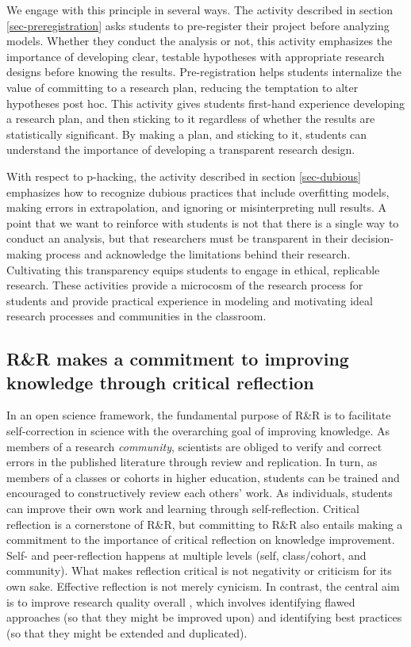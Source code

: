 \documentclass[
  12pt]{article}
\begin{document}
We engage with this principle in several ways.
The activity described in section \ref{sec-preregistration} asks students to pre-register their project before analyzing models.
Whether they conduct the analysis or not, this activity emphasizes the importance of developing clear, testable hypotheses with appropriate research designs before knowing the results.
Pre-registration helps students internalize the value of committing to a research plan, reducing the temptation to alter hypotheses post hoc.
This activity gives students first-hand experience developing a research plan, and then sticking to it regardless of whether the results are statistically significant.
By making a plan, and sticking to it, students can understand the importance of developing a transparent research design.

With respect to p-hacking, the activity described in section \ref{sec-dubious} emphasizes how to recognize dubious practices that include overfitting models, making errors in extrapolation, and ignoring or misinterpreting null results.
A point that we want to reinforce with students is not that there is a single way to conduct an analysis, but that researchers must be transparent in their decision-making process and acknowledge the limitations behind their research.
Cultivating this transparency equips students to engage in ethical, replicable research.
These activities provide a microcosm of the research process for students and provide practical experience in modeling and motivating ideal research processes and communities in the classroom. 

\subsection{R\&R makes a commitment to improving knowledge through critical \textbf{reflection}}

In an open science framework, the fundamental purpose of R\&R is to facilitate self-correction in science \citep{nosek_promoting_2015} with the overarching goal of improving knowledge. 
As members of a research \textit{community}, scientists are obliged to verify and correct errors in the published literature through review and replication. 
In turn, as members of a classes or cohorts in higher education, students can be trained and encouraged to constructively review each others' work. 
As individuals, students can improve their own work and learning through self-reflection. 
Critical reflection is a cornerstone of R\&R, but committing to R\&R also entails making a commitment to the importance of critical reflection on knowledge improvement. Self- and peer-reflection happens at multiple levels (self, class/cohort, and community).
What makes reflection critical is not negativity or criticism for its own sake. 
Effective reflection is not merely cynicism. 
In contrast, the central aim is to improve research quality overall \citep{janz_replicate_2021}, which involves identifying flawed approaches (so that they might be improved upon) and identifying best practices (so that they might be extended and duplicated).
\end{document}

